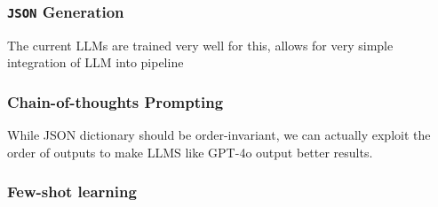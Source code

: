 \subsubsection{\texttt{JSON} Generation}
The current LLMs are trained very well for this, allows for very simple integration of LLM into pipeline

\subsubsection{Chain-of-thoughts Prompting}
While JSON dictionary should be order-invariant, we can actually exploit the order of outputs to make LLMS like GPT-4o output better results.

\subsubsection{Few-shot learning}



